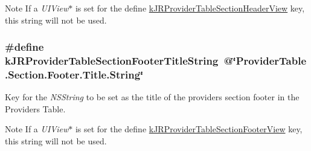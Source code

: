 \begin{DoxyNote}{Note}
If a {\itshape UIView$\ast$\/} is set for the define \hyperlink{group__custom_interface_gaaff8ebdd2b9badb1d0a019a71d47db46}{kJRProviderTableSectionHeaderView} key, this string will not be used. 
\end{DoxyNote}
\hypertarget{group__custom_interface_ga72e63105251e7d4d6a363e279c2bf775}{
\subsubsection[{kJRProviderTableSectionFooterTitleString}]{\setlength{\rightskip}{0pt plus 5cm}\#define kJRProviderTableSectionFooterTitleString~@\char`\"{}ProviderTable.Section.Footer.Title.String\char`\"{}}}
\label{group__custom_interface_ga72e63105251e7d4d6a363e279c2bf775}
Key for the {\itshape NSString\/} to be set as the title of the providers section footer in the Providers Table.

\begin{DoxyNote}{Note}
If a {\itshape UIView$\ast$\/} is set for the define \hyperlink{group__custom_interface_ga984c096e9258dea402a1c27ae8bb6c8f}{kJRProviderTableSectionFooterView} key, this string will not be used. 
\end{DoxyNote}
